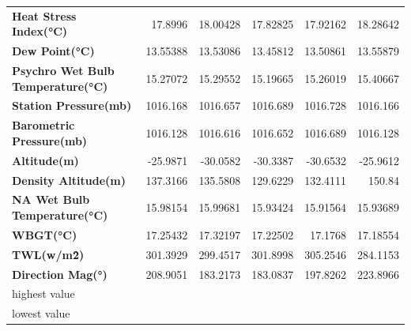 \documentclass[a4paper]{article}
\begin{document}
\begin{table}[htbp]
\begin{tabular}{lrrrrr}
    \textbf{Heat Stress Index(°C)} & \cellcolor[rgb]{ .608,  .804,  .608}17.8996 & 18.00428 & 17.82825 & 17.92162 & \cellcolor[rgb]{ .98,  .502,  .447}18.28642 \\
    \textbf{Dew Point(°C)} & 13.55388 & 13.53086 & \cellcolor[rgb]{ .608,  .804,  .608}13.45812 & 13.50861 & \cellcolor[rgb]{ .98,  .502,  .447}13.55879 \\
    \textbf{Psychro Wet Bulb Temperature(°C)} & 15.27072 & 15.29552 & \cellcolor[rgb]{ .608,  .804,  .608}15.19665 & 15.26019 & \cellcolor[rgb]{ .98,  .502,  .447}15.40667 \\
    \textbf{Station Pressure(mb)} & 1016.168 & 1016.657 & 1016.689 & 1016.728 & \cellcolor[rgb]{ .608,  .804,  .608}1016.166 \\
    \textbf{Barometric Pressure(mb)} & \cellcolor[rgb]{ .608,  .804,  .608}1016.128 & 1016.616 & 1016.652 & \cellcolor[rgb]{ .98,  .502,  .447}1016.689 & \cellcolor[rgb]{ .608,  .804,  .608}1016.128 \\
    \textbf{Altitude(m)} & -25.9871 & -30.0582 & -30.3387 & \cellcolor[rgb]{ .608,  .804,  .608}-30.6532 & \cellcolor[rgb]{ .98,  .502,  .447}-25.9612 \\
    \textbf{Density Altitude(m)} & 137.3166 & 135.5808 & \cellcolor[rgb]{ .608,  .804,  .608}129.6229 & 132.4111 & \cellcolor[rgb]{ .98,  .502,  .447}150.84 \\
    \textbf{NA Wet Bulb Temperature(°C)} & 15.98154 & \cellcolor[rgb]{ .98,  .502,  .447}15.99681 & 15.93424 & \cellcolor[rgb]{ .608,  .804,  .608}15.91564 & 15.93689 \\
    \textbf{WBGT(°C)} & 17.25432 & \cellcolor[rgb]{ .98,  .502,  .447}17.32197 & 17.22502 & \cellcolor[rgb]{ .608,  .804,  .608}17.1768 & 17.18554 \\
    \textbf{TWL(w/m\^2)} & 301.3929 & 299.4517 & 301.8998 & \cellcolor[rgb]{ .98,  .502,  .447}305.2546 & \cellcolor[rgb]{ .608,  .804,  .608}284.1153 \\
    \textbf{Direction Mag(°)} & 208.9051 & 183.2173 & \cellcolor[rgb]{ .608,  .804,  .608}183.0837 & 197.8262 & \cellcolor[rgb]{ .98,  .502,  .447}223.8966 \\
    \midrule
    \rowcolor[rgb]{ .98,  .502,  .447} highest value & \cellcolor[rgb]{ 1,  1,  1} & \cellcolor[rgb]{ 1,  1,  1} & \cellcolor[rgb]{ 1,  1,  1} & \cellcolor[rgb]{ 1,  1,  1} & \cellcolor[rgb]{ 1,  1,  1} \\
    \rowcolor[rgb]{ .608,  .804,  .608} lowest value & \cellcolor[rgb]{ 1,  1,  1} & \cellcolor[rgb]{ 1,  1,  1} & \cellcolor[rgb]{ 1,  1,  1} & \cellcolor[rgb]{ 1,  1,  1} & \cellcolor[rgb]{ 1,  1,  1} \\
    \end{tabular}%
\end{table}%
\end{document}

